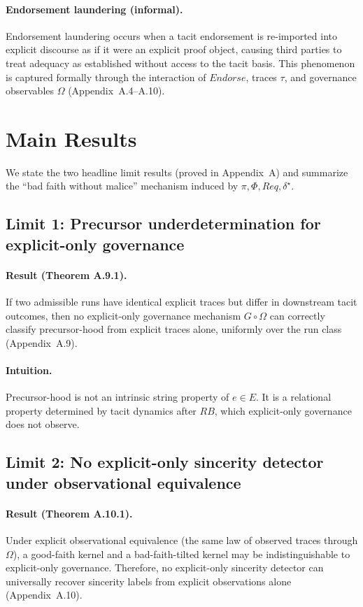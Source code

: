 \documentclass[preprints,article,submit,pdftex,moreauthors,accept]{Definitions/mdpi}
\begin{document}
\paragraph{Endorsement laundering (informal).}
Endorsement laundering occurs when a tacit endorsement is re-imported into explicit discourse as if it were an explicit proof object, causing third parties to treat adequacy as established without access to the tacit basis. This phenomenon is captured formally through the interaction of \(Endorse\), traces \(\tau\), and governance observables \(\Omega\) (Appendix~A.4--A.10).

\section{Main Results}
We state the two headline limit results (proved in Appendix~A) and summarize the ``bad faith without malice'' mechanism induced by \(\pi,\Phi,Req,\delta^\star\).

\subsection{Limit 1: Precursor underdetermination for explicit-only governance}
\paragraph{Result (Theorem A.9.1).}
If two admissible runs have identical explicit traces but differ in downstream tacit outcomes, then no explicit-only governance mechanism \(G\circ \Omega\) can correctly classify precursor-hood from explicit traces alone, uniformly over the run class (Appendix~A.9).

\paragraph{Intuition.}
Precursor-hood is not an intrinsic string property of \(e\in E\). It is a relational property determined by tacit dynamics after \(RB\), which explicit-only governance does not observe.

\subsection{Limit 2: No explicit-only sincerity detector under observational equivalence}
\paragraph{Result (Theorem A.10.1).}
Under explicit observational equivalence (the same law of observed traces through \(\Omega\)), a good-faith kernel and a bad-faith-tilted kernel may be indistinguishable to explicit-only governance. Therefore, no explicit-only sincerity detector can universally recover sincerity labels from explicit observations alone (Appendix~A.10).
\end{document}
